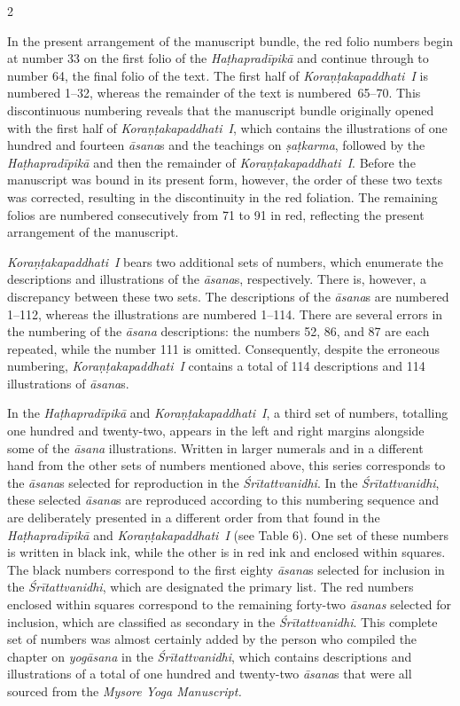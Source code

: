 \begin{nohyp}
\begin{multicols*}{2}
\begin{eng}
In the present arrangement of the manuscript bundle, the red folio numbers begin at number 33 on the first folio of the \emph{Haṭhapradīpikā} and continue through to number 64, the final folio of the text\emph{.} The first half of \emph{Koraṇṭakapaddhati~I} is numbered 1--32, whereas the remainder of the text is numbered~65--70. This discontinuous numbering reveals that the manuscript bundle originally opened with the first half of \emph{Koraṇṭakapaddhati~I}, which contains the illustrations of one hundred and fourteen \emph{āsana}s and the teachings on \emph{ṣaṭkarma}, followed by the \emph{Haṭhapradīpikā} and then the remainder of \emph{Koraṇṭakapaddhati~I}. Before the manuscript was bound in its present form, however, the order of these two texts was corrected, resulting in the discontinuity in the red foliation. The remaining folios are numbered consecutively from 71 to 91 in red, reflecting the present arrangement of the manuscript.

\emph{Koraṇṭakapaddhati}~\emph{I} bears two additional sets of numbers, which enumerate the descriptions and illustrations of the \emph{āsana}s, respectively. There is, however, a discrepancy between these two sets. The descriptions of the \emph{āsana}s are numbered 1--112, whereas the illustrations are numbered 1--114. There are several errors in the numbering of the \emph{āsana} descriptions: the numbers 52, 86, and 87 are each repeated, while the number 111 is omitted. Consequently, despite the erroneous numbering, \emph{Koraṇṭakapaddhati}~\emph{I} contains a total of 114 descriptions and 114 illustrations of \emph{āsana}s.

In the \emph{Haṭhapradīpikā} and \emph{Koraṇṭakapaddhati}~\emph{I}, a third set of numbers, totalling one hundred and twenty-two, appears in the left and right margins alongside some of the \emph{āsana} illustrations. Written in larger numerals and in a different hand from the other sets of numbers mentioned above, this series corresponds to the \emph{āsana}s selected for reproduction in the \emph{Śrītattvanidhi}. In the \emph{Śrītattvanidhi}, these selected \emph{āsana}s are reproduced according to this numbering sequence and are deliberately presented in a different order from that found in the \emph{Haṭhapradīpikā} and \emph{Koraṇṭakapaddhati}~\emph{I} (see Table 6). One set of these numbers is written in black ink, while the other is in red ink and enclosed within squares. The black numbers correspond to the first eighty \emph{āsana}s selected for inclusion in the \emph{Śrītattvanidhi}, which are designated the primary list. The red numbers enclosed within squares correspond to the remaining forty-two \emph{āsanas} selected for inclusion, which are classified as secondary in the \emph{Śrītattvanidhi}. This complete set of numbers was almost certainly added by the person who compiled the chapter on \emph{yogāsana} in the \emph{Śrītattvanidhi}, which contains descriptions and illustrations of a total of one hundred and twenty-two \emph{āsana}s that were all sourced from the \emph{Mysore Yoga Manuscript.}
\vskip 18pt


\end{eng}
\end{multicols*}
\end{nohyp}
